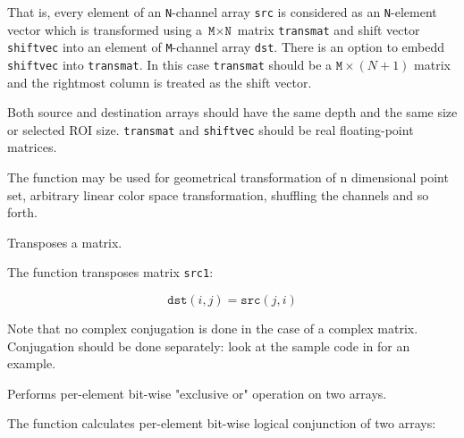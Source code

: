 That is, every element of an \texttt{N}-channel array \texttt{src} is
considered as an \texttt{N}-element vector which is transformed using
a $\texttt{M} \times \texttt{N}$ matrix \texttt{transmat} and shift
vector \texttt{shiftvec} into an element of \texttt{M}-channel array
\texttt{dst}. There is an option to embedd \texttt{shiftvec} into
\texttt{transmat}. In this case \texttt{transmat} should be a $\texttt{M}
\times (N+1)$ matrix and the rightmost column is treated as the shift
vector.

Both source and destination arrays should have the same depth and the
same size or selected ROI size. \texttt{transmat} and \texttt{shiftvec}
should be real floating-point matrices.

The function may be used for geometrical transformation of n dimensional
point set, arbitrary linear color space transformation, shuffling the
channels and so forth.

Transposes a matrix.


\begin{description}
\end{description}

The function transposes matrix \texttt{src1}:

\[ \texttt{dst}(i,j) = \texttt{src}(j,i) \]

Note that no complex conjugation is done in the case of a complex
matrix. Conjugation should be done separately: look at the sample code
in  for an example.

Performs per-element bit-wise "exclusive or" operation on two arrays.


\begin{description}
\end{description}

The function calculates per-element bit-wise logical conjunction of two arrays:

